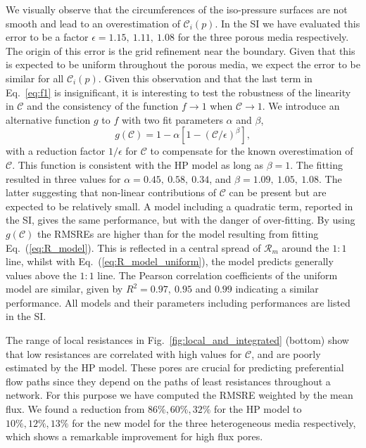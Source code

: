 \documentclass[draft]{agujournal2019}
\begin{document}
We visually observe that the circumferences of the iso-pressure surfaces are not smooth and lead to an overestimation of $\mathcal{C}_i(p)$. In the SI we have evaluated this error to be a factor $\epsilon = 1.15,~1.11,~1.08$ for the three porous media respectively. The origin of this error is the grid refinement near the boundary. Given that this is expected to be uniform throughout the porous media, we expect the error to be similar for all $\mathcal{C}_i(p)$. Given this observation and that the last term in Eq.~\ref{eq:f1} is insignificant, it is interesting to test the robustness of the linearity in $\mathcal{C}$ and the consistency of the function $f \rightarrow 1$ when $\mathcal{C}\rightarrow 1$. We introduce an alternative function $g$ to $f$ with two fit parameters $\alpha$ and $\beta$,
\begin{equation}
	g(\mathcal{C}) = 1-\alpha\left[1-\left(\mathcal{C}/\epsilon\right)^{\beta}\right] \label{eq:R_model_uniform},
\end{equation}
with a reduction factor $1/\epsilon$ for $\mathcal{C}$ to compensate for the known overestimation of $\mathcal{C}$. This function is consistent with the HP model as long as $\beta =1$. The fitting resulted in three values for $\alpha = 0.45,~0.58,~0.34$, and $\beta = 1.09,~1.05,~1.08$. The latter suggesting that non-linear contributions of $\mathcal{C}$ can be present but are expected to be relatively small. A model including a quadratic term, reported in the SI, gives the same performance, but with the danger of over-fitting. By using $g(\mathcal{C})$ the RMSREs are higher than for the model resulting from fitting Eq.~(\ref{eq:R_model}). This is reflected in a central spread of $\mathcal{R}_m$ around the $1:1$ line, whilst with Eq.~(\ref{eq:R_model_uniform}), the model predicts generally values above the $1:1$ line. The Pearson correlation coefficients of the uniform model are similar, given by $R^2 = 0.97,~0.95$ and $0.99$ indicating a similar performance. All models and their parameters including performances are listed in the SI.

The range of local resistances in Fig.~\ref{fig:local_and_integrated} (bottom) show that low resistances are correlated with high values for $\mathcal{C}$, and are poorly estimated by the HP model. These pores are crucial for predicting preferential flow paths since they depend on the paths of least resistances throughout a network. For this purpose we have computed the RMSRE weighted by the mean flux. We found a reduction from $86\%, 60\%, 32\%$ for the HP model to $10\%, 12\%, 13\%$ for the new model for the three heterogeneous media respectively, which shows a remarkable improvement for high flux pores.  
\end{document}
